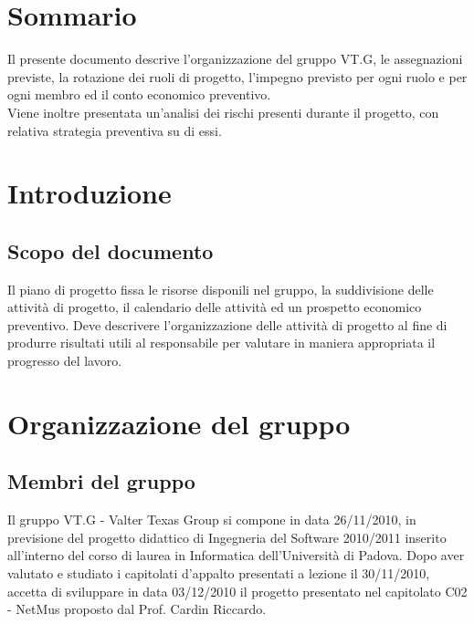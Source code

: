 \tableofcontents
\thispagestyle{fancy} %


\chapter*{Sommario}
Il presente documento descrive l'organizzazione del gruppo VT.G, le
assegnazioni previste, la rotazione dei ruoli di progetto, l'impegno previsto
per ogni ruolo e per ogni membro ed il conto economico preventivo.\\
Viene inoltre presentata un'analisi dei rischi presenti durante il progetto, con relativa strategia preventiva su di essi.


\thispagestyle{fancy} %

\chapter{Introduzione}
\thispagestyle{fancy} %

\section{Scopo del documento}
Il piano di progetto fissa le risorse disponili nel gruppo, la suddivisione
delle attivit\`a di progetto, il calendario delle attivit\`a ed un prospetto
economico preventivo. Deve descrivere l'organizzazione delle attivit\`a di
progetto al fine di produrre risultati utili al responsabile per valutare in
maniera appropriata il progresso del lavoro.




\chapter{Organizzazione del gruppo}
\thispagestyle{fancy}

\section{Membri del gruppo}
Il gruppo VT.G - Valter Texas Group si compone in data 26/11/2010, in previsione
del progetto didattico di Ingegneria del Software 2010/2011 inserito
all'interno del corso di laurea in Informatica dell'Universit\`a di Padova.
Dopo aver valutato e studiato i capitolati d'appalto presentati a lezione il
30/11/2010, accetta di sviluppare in data 03/12/2010 il progetto presentato nel capitolato C02 - NetMus proposto dal Prof. Cardin Riccardo.\\

